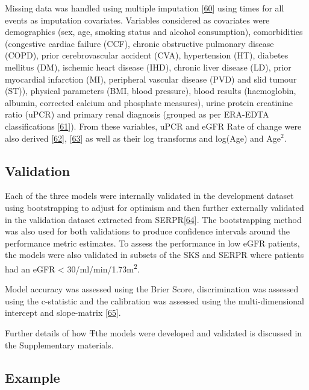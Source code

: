 \documentclass[
]{article}
\begin{document}
Missing data was handled using multiple imputation {[}\protect\hyperlink{ref-white_imputing_2009}{60}{]} using times for all events as imputation covariates. Variables considered as covariates were demographics (sex, age, smoking status and alcohol consumption), comorbidities (congestive cardiac failure (CCF), chronic obstructive pulmonary disease (COPD), prior cerebrovascular accident (CVA), hypertension (HT), diabetes mellitus (DM), ischemic heart disease (IHD), chronic liver disease (LD), prior myocardial infarction (MI), peripheral vascular disease (PVD) and slid tumour (ST)), physical parameters (BMI, blood pressure), blood results (haemoglobin, albumin, corrected calcium and phosphate measures), urine protein creatinine ratio (uPCR) and primary renal diagnosis (grouped as per ERA-EDTA classifications {[}\protect\hyperlink{ref-venkat-raman_new_2012}{61}{]}). From these variables, uPCR and eGFR Rate of change were also derived {[}\protect\hyperlink{ref-kovesdy_past_2016}{62}{]}, {[}\protect\hyperlink{ref-naimark_past_2016}{63}{]} as well as their log transforms and log(Age) and Age\(^2\).

\hypertarget{validation}{%
\subsection{Validation}\label{validation}}

Each of the three models were internally validated in the development dataset using bootstrapping to adjust for optimism and then further externally validated in the validation dataset extracted from SERPR{[}\protect\hyperlink{ref-schomaker_bootstrap_2018}{64}{]}. The bootstrapping method was also used for both validations to produce confidence intervals around the performance metric estimates. To assess the performance in low eGFR patients, the models were also validated in subsets of the SKS and SERPR where patients had an eGFR \textless{} 30/ml/min/1.73m\textsuperscript{2}.

Model accuracy was assessed using the Brier Score, discrimination was assessed using the c-statistic and the calibration was assessed using the multi-dimensional intercept and slope-matrix {[}\protect\hyperlink{ref-chap-performance-metrics}{65}{]}.

Further details of how \sout{T}the models were developed and validated is discussed in the Supplementary materials.

\hypertarget{example}{%
\subsection{Example}\label{example}}
\end{document}
